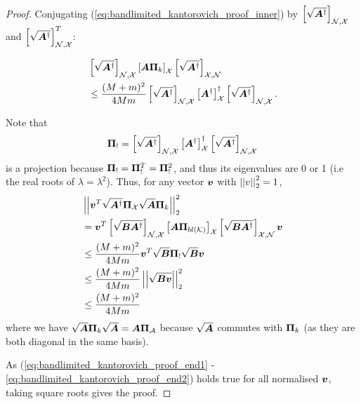 \begin{proof}
    Conjugating (\ref{eq:bandlimited_kantorovich_proof_inner}) by $\msubgen[\set{N},\set{X}]{\sqrt{\matr{A}^{\dagger}}}$ and $\msubgen[\set{N},\set{X}]{\sqrt{\matr{A}^{\dagger}}}^{T}$:
    
    \begin{align}
        &\msubgen[\set{N},\set{X}]{\sqrt{\matr{A}^{\dagger}}}\msubgen[\set{X}]{\matr{A}\projgen{k}} \msubgen[\set{X},\set{N}]{\sqrt{\matr{A}^{\dagger}}} \\
        &\leq \frac{(M+m)^{2}}{4Mm} \msubgen[\set{N},\set{X}]{\sqrt{\matr{A}^{\dagger}}}\msubgen[\set{X}]{\matr{A}^{\dagger}}^{\dagger}\msubgen[\set{N},\set{X}]{\sqrt{\matr{A}^{\dagger}}}.
    \end{align}

    Note that 
    \begin{equation}
        \proj{!} = \msubgen[\set{N},\set{X}]{\sqrt{\matr{A}^{\dagger}}}\msubgen[\set{X}]{\matr{A}^{\dagger}}^{\dagger}\msubgen[\set{N},\set{X}]{\sqrt{\matr{A}^{\dagger}}}
    \end{equation}
    is a projection because $\proj{!} = \proj{!}^{T} = \proj{!}^{2}$, and thus its eigenvalues are 0 or 1 (i.e the real roots of $\lambda = \lambda^{2}$). Thus, for any vector $\bm{v}$ with $\left\lvert\left\lvert v\right\rvert\right\rvert^{2}_{2} = 1$,
    \begin{align}
    &\sqnormvec{\vect{v}^{T}\sqrt{\matr{A}^{\dagger}}\proj{X}\sqrt{\matr{A}}\projgen{k} } \label{eq:bandlimited_kantorovich_proof_end1}\\
        &=\vect{v}^{T}\msubgen[\set{N},\set{X}]{\sqrt{\matr{B}\matr{A}^{\dagger}}}\msubgen[\set{X}]{\matr{A}\projbl} \msubgen[\set{X},\set{N}]{\sqrt{\matr{B}\matr{A}^{\dagger}}}\vect{v}\\
        &\leq \frac{(M+m)^{2}}{4Mm} \vect{v}^{T}\sqrt{\matr{B}}\proj{!}\sqrt{\matr{B}}\vect{v} \\
        &\leq \frac{(M+m)^{2}}{4Mm} \sqnormvec{\sqrt{\matr{B}\vect{v}}} \\
        &\leq \frac{(M+m)^{2}}{4Mm} \label{eq:bandlimited_kantorovich_proof_end2}
    \end{align}
    where we have $\sqrt{\matr{A}} \projgen{k} \sqrt{\matr{A}} = \matr{A}\proj{A}$ because $\sqrt{\bm{A}}$ commutes with $\projgen{k}$ (as they are both diagonal in the same basis).
    
    As (\ref{eq:bandlimited_kantorovich_proof_end1} - \ref{eq:bandlimited_kantorovich_proof_end2}) holds true for all normalised $\bm{v}$, taking square roots gives the proof.
\end{proof}



